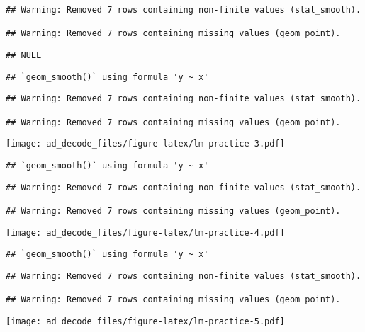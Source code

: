 \documentclass[
]{article}
\begin{document}
\begin{verbatim}
## Warning: Removed 7 rows containing non-finite values (stat_smooth).

## Warning: Removed 7 rows containing missing values (geom_point).
\end{verbatim}

\begin{verbatim}
## NULL
\end{verbatim}

\begin{verbatim}
## `geom_smooth()` using formula 'y ~ x'
\end{verbatim}

\begin{verbatim}
## Warning: Removed 7 rows containing non-finite values (stat_smooth).

## Warning: Removed 7 rows containing missing values (geom_point).
\end{verbatim}

\texttt{[image: ad\_decode\_files/figure-latex/lm-practice-3.pdf]}

\begin{verbatim}
## `geom_smooth()` using formula 'y ~ x'
\end{verbatim}

\begin{verbatim}
## Warning: Removed 7 rows containing non-finite values (stat_smooth).

## Warning: Removed 7 rows containing missing values (geom_point).
\end{verbatim}

\texttt{[image: ad\_decode\_files/figure-latex/lm-practice-4.pdf]}

\begin{verbatim}
## `geom_smooth()` using formula 'y ~ x'
\end{verbatim}

\begin{verbatim}
## Warning: Removed 7 rows containing non-finite values (stat_smooth).

## Warning: Removed 7 rows containing missing values (geom_point).
\end{verbatim}

\texttt{[image: ad\_decode\_files/figure-latex/lm-practice-5.pdf]}
\end{document}
